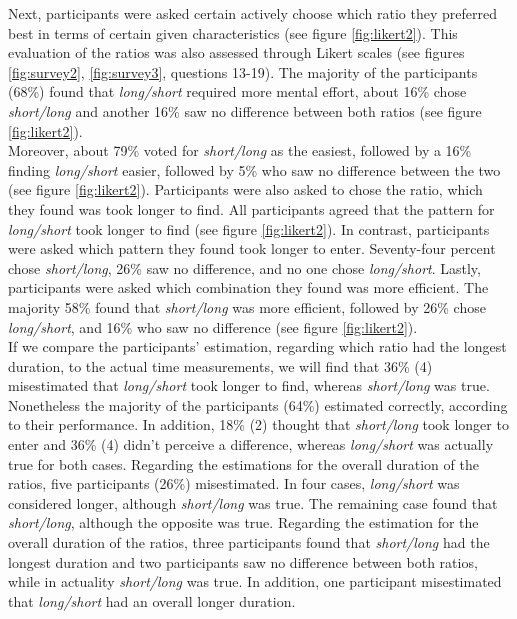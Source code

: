 Next, participants were asked certain actively choose which ratio they preferred best in terms of certain given characteristics (see figure \ref{fig:likert2}). This evaluation of the ratios was also assessed through Likert scales (see figures \ref{fig:survey2}, \ref{fig:survey3}, questions 13-19). The majority of the participants (68\%) found that \textit{long/short} required more mental effort, about 16\% chose \textit{short/long} and another 16\% saw no difference between both ratios (see figure \ref{fig:likert2}). \\
Moreover, about 79\% voted for \textit{short/long} as the easiest, followed by a 16\% finding \textit{long/short} easier, followed by 5\% who saw no difference between the two (see figure \ref{fig:likert2}). Participants were also asked to chose the ratio, which they found was took longer to find. All participants agreed that the pattern for \textit{long/short} took longer to find (see figure \ref{fig:likert2}). In contrast, participants were asked which pattern they found took longer to enter. Seventy-four percent chose \textit{short/long}, 26\% saw no difference, and no one chose \textit{long/short}. Lastly, participants were asked which combination they found was more efficient. The majority 58\% found that \textit{short/long} was more efficient, followed by 26\% chose \textit{long/short}, and 16\% who saw no difference (see figure \ref{fig:likert2}). \\

If we compare the participants' estimation, regarding which ratio had the longest duration, to the actual time measurements, we will find that 36\% (4) misestimated that \textit{long/short} took longer to find, whereas \textit{short/long} was true. Nonetheless the majority of the participants (64\%) estimated correctly, according to their performance. In addition, 18\% (2) thought that \textit{short/long} took longer to enter and 36\% (4) didn't perceive a difference, whereas \textit{long/short} was actually true for both cases. Regarding the estimations for the overall duration of the ratios, five participants (26\%) misestimated. In four cases, \textit{long/short} was considered longer, although \textit{short/long} was true. The remaining case found that \textit{short/long}, although the opposite was true. Regarding the estimation for the overall duration of the ratios, three participants found that \textit{short/long} had the longest duration and two participants saw no difference between both ratios, while in actuality \textit{short/long} was true. In addition, one participant misestimated that \textit{long/short} had an overall longer duration.\\

